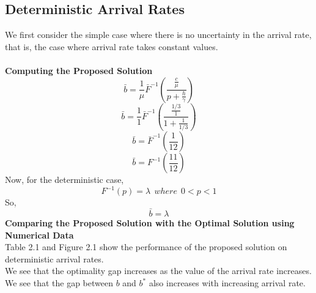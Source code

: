 \subsection{Deterministic Arrival Rates}
We first consider the simple case where there is no uncertainty in the arrival rate, that is, the case where arrival rate takes constant values. \\ \\
\textbf{Computing the Proposed Solution}\\
\[\bar{b}=\frac{1}{\mu}\bar{F}^{-1}(\frac{\frac{c}{\mu}}{p + \frac{h}{\gamma}})\]
\[\bar{b}=\frac{1}{1}\bar{F}^{-1}(\frac{\frac{1/3}{1}}{1 + \frac{1}{1/3}})\]
\[\bar{b}=\bar{F}^{-1}(\frac{1}{12})\]
\[\bar{b}=F^{-1}(\frac{11}{12})\]
Now, for the deterministic case,
\[F^{-1}(p) = \lambda \ \ where \ \ 0<p<1\]
So,
\[\bar{b}= \lambda \]
\textbf{Comparing the Proposed Solution with the Optimal Solution using Numerical Data}\\
Table 2.1 and Figure 2.1 show the performance of the proposed solution on deterministic arrival rates. \\
We see that the optimality gap increases as the value of the arrival rate increases. We see that the gap between $b$ and $b^*$ also increases with increasing arrival rate.

